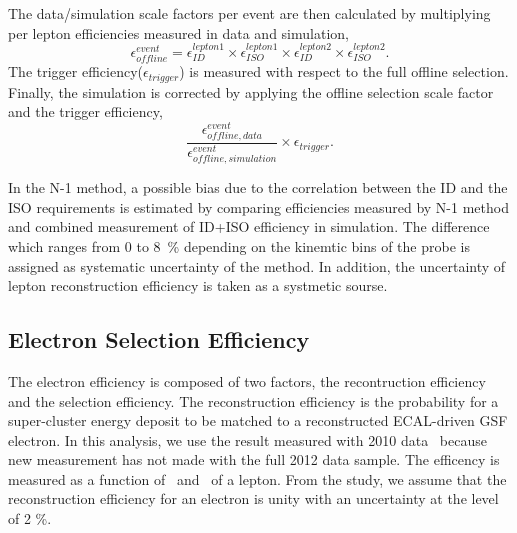 The data/simulation scale factors per event are then calculated by 
multiplying per lepton efficiencies measured in data and simulation, 
\begin{equation} 
\epsilon_{offline}^{event} 
= 
\epsilon_{ID}^{lepton1} \times \epsilon_{ISO}^{lepton1}   
\times \epsilon_{ID}^{lepton2} \times \epsilon_{ISO}^{lepton2}.   
\end{equation} 
The trigger efficiency($\epsilon_{trigger}$) is measured with respect to the full 
offline selection. Finally, the simulation is corrected by applying the 
offline selection scale factor and the trigger efficiency, 
\begin{equation} 
\frac{\epsilon_{offline, data}^{event}}{\epsilon_{offline, simulation}^{event}} 
\times \epsilon_{trigger}. 
\end{equation} 

In the N-1 method, a possible bias due to the correlation between 
the ID and the ISO requirements is estimated by comparing efficiencies 
measured by N-1 method and combined measurement of ID+ISO efficiency in simulation. 
The difference which ranges from 0 to 8~\% depending 
on the kinemtic bins of the probe is assigned as systematic uncertainty of the method.  
In addition, the uncertainty of lepton reconstruction efficiency is taken 
as a systmetic sourse. 


\subsection{Electron Selection Efficiency}
\label{sec:electroneff}

The electron efficiency is composed of two factors, the recontruction efficiency and 
the selection efficiency. The reconstruction efficiency is the probability for a 
super-cluster energy deposit to be matched to a reconstructed ECAL-driven 
GSF electron. In this analysis, we use the result measured with 2010 
data~\cite{Khachatryan:2010xn}  
because new measurement has not made with the full 2012 data sample. 
The efficency is measured as a function 
of \pt~and \Eta~of a lepton. From the study, we assume that the reconstruction 
efficiency for an electron is unity with an uncertainty at the level of 2 \%.

